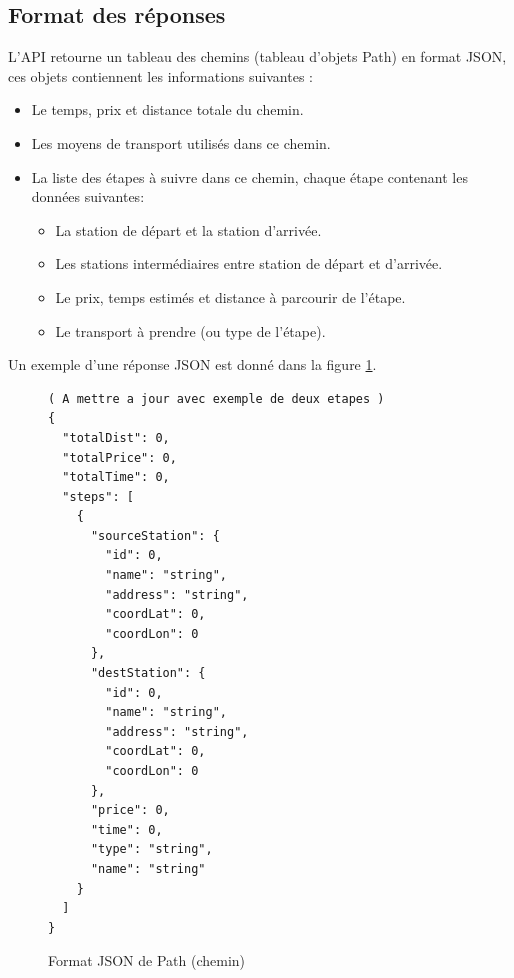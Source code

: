 \subsection{Format des réponses}
\label{ref:formatReponse}
L'API retourne un tableau des chemins (tableau d'objets Path) en format JSON, ces objets contiennent les informations suivantes :
\begin{itemize}
	\item Le temps, prix et distance totale du chemin.
	\item Les moyens de transport utilisés dans ce chemin.
	\item La liste des étapes à suivre dans ce chemin, chaque étape contenant les données suivantes:
	      \begin{itemize}
	      	\item La station de départ et la station d'arrivée.
	      	\item Les stations intermédiaires entre station de départ et d'arrivée.
	      	\item Le prix, temps estimés et distance à parcourir de l'étape.
	      	\item Le transport à prendre (ou type de l'étape).
	      \end{itemize}
\end{itemize}

Un exemple d'une réponse JSON est donné dans la figure \ref{fig:JSONPath}.

\begin{figure}
\begin{lstlisting}[]
( A mettre a jour avec exemple de deux etapes )
{
  "totalDist": 0,
  "totalPrice": 0,
  "totalTime": 0,
  "steps": [
    {
      "sourceStation": {
        "id": 0,
        "name": "string",
        "address": "string",
        "coordLat": 0,
        "coordLon": 0
      },
      "destStation": {
        "id": 0,
        "name": "string",
        "address": "string",
        "coordLat": 0,
        "coordLon": 0
      },
      "price": 0,
      "time": 0,
      "type": "string",
      "name": "string"
    }
  ]
}
\end{lstlisting}
\caption{Format JSON de Path (chemin)}
\label{fig:JSONPath}
\end{figure}

\newpage
